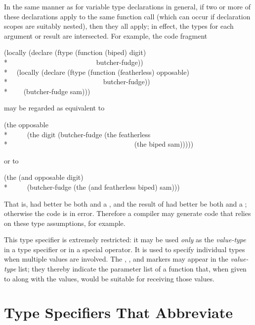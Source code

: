 \begin{flushdesc}
In the same manner as for variable type declarations in general,
if two or more
of these declarations apply to the same function call (which can
occur if declaration scopes are suitably nested), then they all apply;
in effect, the types for each argument or result are intersected.
For example, the code fragment
\begin{lisp}
(locally (declare (ftype (function (biped) digit) \\*
~~~~~~~~~~~~~~~~~~~~~~~~~butcher-fudge)) \\*
~~(locally (declare (ftype (function (featherless) opposable) \\*
~~~~~~~~~~~~~~~~~~~~~~~~~~~butcher-fudge)) \\*
~~~~(butcher-fudge sam)))
\end{lisp}
may be regarded as equivalent to
\begin{lisp}
(the opposable \\*
~~~~~(the digit (butcher-fudge (the featherless \\*
~~~~~~~~~~~~~~~~~~~~~~~~~~~~~~~~~~~~(the biped sam)))))
\end{lisp}
or to
\begin{lisp}
(the (and opposable digit) \\*
~~~~~(butcher-fudge (the (and featherless biped) sam)))
\end{lisp}
That is,  had better be both  and a ,
and the result of  had better be both
 and a ; otherwise the code is in error.
Therefore a compiler may generate code that relies on these type assumptions,
for example.

\item[\cd{(values \emph{value1-type} \emph{value2-type} ...)}]
This type specifier is extremely restricted: it may be used \emph{only}
as the \emph{value-type} in a  type specifier or in
a  special operator.  It is used to specify individual types when
multiple values are involved.
The
, , and  markers may appear in the
\emph{value-type} list;
they thereby indicate the parameter list of a
function that, when given to  along with
the values, would be suitable for receiving those values.
\end{flushdesc}

\section{Type Specifiers That Abbreviate}

